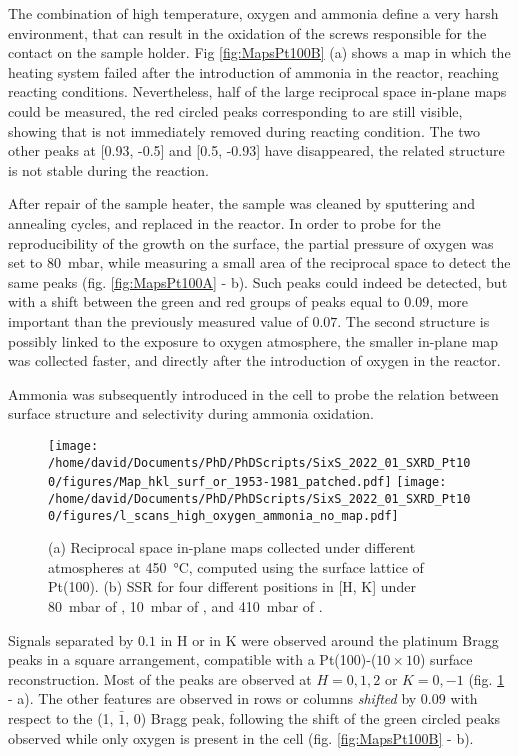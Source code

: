 The combination of high temperature, oxygen and ammonia define a very harsh environment, that can result in the oxidation of the screws responsible for the contact on the sample holder.
Fig \ref{fig:MapsPt100B} (a) shows a map in which the heating system failed after the introduction of ammonia in the reactor, reaching reacting conditions.
Nevertheless, half of the large reciprocal space in-plane maps could be measured, the red circled peaks corresponding to  are still visible, showing that  is not immediately removed during reacting condition.
The two other peaks at [0.93, -0.5] and [0.5, -0.93] have disappeared, the related structure is not stable during the reaction.

After repair of the sample heater, the sample was cleaned by sputtering and annealing cycles, and replaced in the reactor.
In order to probe for the reproducibility of the  growth on the surface, the partial pressure of oxygen was set to \qty{80}{\milli\bar}, while measuring a small area of the reciprocal space to detect the same peaks (fig. \ref{fig:MapsPt100A} - b).
Such peaks could indeed be detected, but with a shift between the green and red groups of peaks equal to $0.09$, more important than the previously measured value of $0.07$.
The second structure is possibly linked to the exposure to oxygen atmosphere, the smaller in-plane map was collected faster, and directly after the introduction of oxygen in the reactor.

Ammonia was subsequently introduced in the cell to probe the relation between surface structure and selectivity during ammonia oxidation.

\begin{figure}[!htb]
    \centering
    \texttt{[image: /home/david/Documents/PhD/PhDScripts/SixS\_2022\_01\_SXRD\_Pt100/figures/Map\_hkl\_surf\_or\_1953-1981\_patched.pdf]}
    \texttt{[image: /home/david/Documents/PhD/PhDScripts/SixS\_2022\_01\_SXRD\_Pt100/figures/l\_scans\_high\_oxygen\_ammonia\_no\_map.pdf]}
    \caption{
        (a) Reciprocal space in-plane maps collected under different atmospheres at \qty{450}{\degreeCelsius}, computed using the surface lattice of Pt(100).
        (b) SSR for four different positions in [H, K] under \qty{80}{\milli\bar} of , \qty{10}{\milli\bar} of , and \qty{410}{\milli\bar} of .
    }
    \label{fig:MapsAndLScansPt100HighOxAmmonia}
\end{figure}

Signals separated by $0.1$ in H or in K were observed around the platinum Bragg peaks in a square arrangement, compatible with a Pt(100)-($10\times10$) surface reconstruction.
Most of the peaks are observed at $H={0,1,2}$ or $K={0, -1}$ (fig. \ref{fig:MapsAndLScansPt100HighOxAmmonia} - a).
The other features are observed in rows or columns \textit{shifted} by $0.09$ with respect to the (1, $\bar{1}$, 0) Bragg peak, following the shift of the green circled peaks observed while only oxygen is present in the cell (fig. \ref{fig:MapsPt100B} - b).

